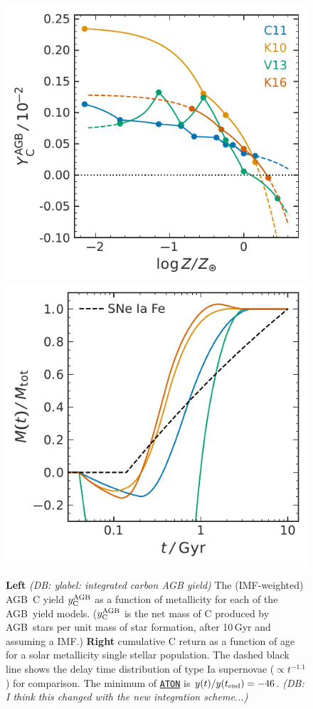 \documentclass[fleqn,
usenatbib]{mnras}
\newcommand{\aton}{\texttt{\hyperlink{aton}{ATON}}}
\newcommand{\agb}{AGB}
\newcommand{\Ycagb}{{y_{\rm C}^{\rm AGB}}}
\newcommand{\dbnote}[1]{ {\color{Thistle} \textit{\small (DB: #1)}} }
\begin{document}
\begin{figure}
    \centering
    \includegraphics{y_agb_vs_z.pdf}
    \includegraphics{y_agb_vs_t.pdf}

    \caption[]{\textbf{Left} \dbnote{ylabel: integrated carbon AGB yield} The (IMF-weighted) \agb\ C yield $\Ycagb$ as a function of metallicity for each of the \agb\ yield models. ($\Ycagb$ is the net mass of C produced by \agb\ stars per unit mass of star formation, after 10\,Gyr and assuming a \citealt{kroupa01} IMF.)
    \textbf{Right} cumulative C return as a function of age for a solar metallicity single stellar population. The dashed black line shows the delay time distribution of type Ia supernovae ($\propto t^{-1.1}$) for comparison. The minimum of \aton{} is $y(t)/y(t_{\rm end})=-46$. \dbnote{I think this changed with the new integration scheme...}
}

    \label{fig:agb-ssp}

\end{figure}
\end{document}
